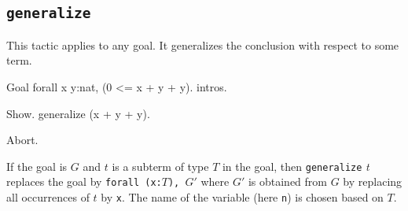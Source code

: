 \begin{coq_example*}
\begin{Variants}
\end{Variants}

\subsection{\tt generalize \term}
\label{generalize}

This tactic applies to any goal. It generalizes the conclusion with
respect to some term.

\Example

\begin{coq_eval}
Goal forall x y:nat, (0 <= x + y + y).
intros.
\end{coq_eval}
\begin{coq_example}
Show.
generalize (x + y + y).
\end{coq_example}

\begin{coq_eval}
Abort.
\end{coq_eval}

If the goal is $G$ and $t$ is a subterm of type $T$ in the goal, then
{\tt generalize} \textit{t} replaces the goal by {\tt forall (x:$T$), $G'$}
where $G'$ is obtained from $G$ by replacing all occurrences of $t$ by
{\tt x}. The name of the variable (here {\tt n}) is chosen based on $T$.

\end{coq_example*}
